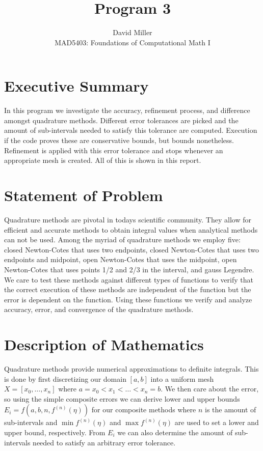 \documentclass[12pt]{article}
\theoremstyle{remark}
\begin{document}
 
\title{Program 3}
\author{David Miller \\ 
MAD5403: Foundations of Computational Math I} 
 
\maketitle

\section{Executive Summary}

In this program we investigate the accuracy, refinement process, and difference amongst quadrature methods. Different error tolerances are picked and the amount of sub-intervals needed to satisfy this tolerance are computed. Execution if the code proves these are conservative bounds, but bounds nonetheless. Refinement is applied with this error tolerance and stops whenever an appropriate mesh is created. All of this is shown in this report.

\section{Statement of Problem} 

Quadrature methods are pivotal in todays scientific community. They allow for efficient and accurate methods to obtain integral values when analytical methods can not be used. Among the myriad of quadrature methods we employ five: closed Newton-Cotes that uses two endpoints, closed Newton-Cotes that uses two endpoints and midpoint, open Newton-Cotes that uses the midpoint, open Newton-Cotes that uses points 1/2 and 2/3 in the interval, and gauss Legendre. We care to test these methods against different types of functions to verify that the correct execution of these methods are independent of the function but the error is dependent on the function. Using these functions we verify and analyze accuracy, error, and convergence of the quadrature methods. 

\section{Description of Mathematics}

Quadrature methods provide numerical approximations to definite integrals. This is done by first discretizing our domain $[a,b]$ into a uniform mesh $X = [x_0, \dots, x_n]$ where $a = x_0 < x_1 < \dots < x_n = b$. We then care about the error, so using the simple composite errors we can derive lower and upper bounds $E_i = f(a, b, n, f^{(n)}(\eta))$ for our composite methods where $n$ is the amount of sub-intervals and $\min f^{(n)}(\eta)$ and $\max f^{(n)}(\eta)$ are used to set a lower and upper bound, respectively. From $E_i$ we can also determine the amount of sub-intervals needed to satisfy an arbitrary error tolerance.
\end{document}
